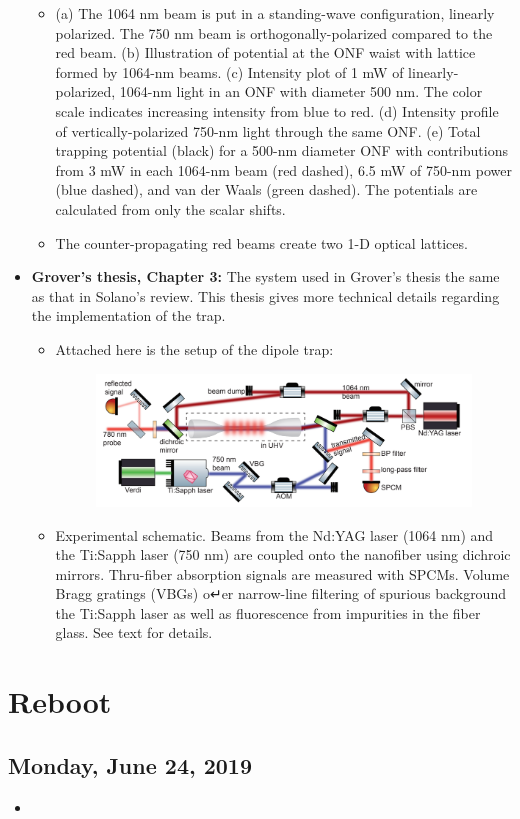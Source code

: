 \documentclass{report}
\theoremstyle{definition}
\begin{document}
\begin{itemize}
\begin{itemize}
	
		\item (a) The 1064 nm beam is put in a standing-wave configuration, linearly polarized. The 750 nm beam is orthogonally-polarized compared to the red beam. (b)  Illustration of potential at the
		ONF waist with lattice formed by 1064-nm beams. (c) Intensity plot of 1 mW of linearly-polarized, 1064-nm light in an ONF with diameter 500 nm. The color scale indicates increasing intensity from blue to red. (d) Intensity profile of vertically-polarized 750-nm light through the same ONF. (e) Total trapping potential (black) for a 500-nm diameter ONF
		with contributions from 3 mW in each 1064-nm beam (red dashed), 6.5
		mW of 750-nm power (blue dashed), and van der Waals (green dashed).
		The potentials are calculated from only the scalar shifts. 
		
		\item The counter-propagating red beams create two 1-D optical lattices. 
	\end{itemize} 



	\item \textbf{Grover's thesis, Chapter 3:} The system used in Grover's thesis the same as that in Solano's review. This thesis gives more technical details regarding the implementation of the trap. 
	
	\begin{itemize}
		\item Attached here is the setup of the dipole trap:
		\begin{figure}[!htb]
			\centering
			\includegraphics[scale=0.5]{dipole-trap-setup}
		\end{figure}
	
	
		\item  Experimental schematic. Beams from the Nd:YAG laser (1064 nm)
		and the Ti:Sapph laser (750 nm) are coupled onto the nanofiber using dichroic mirrors. Thru-fiber absorption signals are measured with SPCMs. Volume Bragg gratings (VBGs) o↵er narrow-line filtering of spurious background the Ti:Sapph laser as well as fluorescence from impurities in the fiber glass. See text for details.
	\end{itemize}
\end{itemize}


\chapter{Reboot}
\section{Monday, June 24, 2019}
\begin{itemize}
	\item 
\end{itemize}
\end{document}
